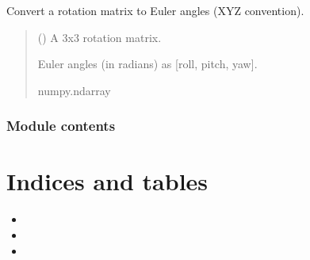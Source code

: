 \documentclass[letterpaper,10pt,english]{sphinxmanual}
\begin{document}

\begin{fulllineitems}
\label{\detokenize{PoseEstimator:PoseEstimator.pose_estimator.rotationMatrixToEulerAngles}}
\pysigstartsignatures
{}
\pysigstopsignatures
\sphinxAtStartPar
Convert a rotation matrix to Euler angles (XYZ convention).
\begin{quote}\begin{description}
\sphinxAtStartPar
{} () \textendash{} A 3x3 rotation matrix.

\sphinxAtStartPar
Euler angles (in radians) as {[}roll, pitch, yaw{]}.

\sphinxAtStartPar
numpy.ndarray

\end{description}\end{quote}

\end{fulllineitems}



\subsection{Module contents}
\label{\detokenize{PoseEstimator:module-PoseEstimator}}\label{\detokenize{PoseEstimator:module-contents}}

\chapter{Indices and tables}
\label{\detokenize{index:indices-and-tables}}\begin{itemize}
\item {} 
\sphinxAtStartPar
{}

\item {} 
\sphinxAtStartPar
{}

\item {} 
\sphinxAtStartPar
{}

\end{itemize}
\end{document}
